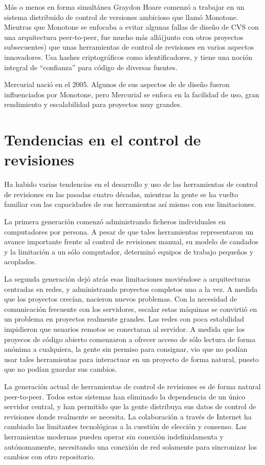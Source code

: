 Más o menos en forma simultánea Graydon Hoare comenzó a trabajar en un
sistema distribuido de control de versiones ambicioso que llamó
Monotone. Mientras que Monotone se enfocaba a evitar algunas fallas de
diseño de CVS con una arquitectura peer-to-peer, fue mucho más
allá(junto con otros proyectos subsecuentes) que unas herramientas de
control de revisiones en varios aspectos innovadores. Usa hashes
criptográficos como identificadores, y tiene una noción integral de 
``confianza'' para código de diversas fuentes.

Mercurial nació en el 2005.  Algunos de sus aspectos de de diseño
fueron influenciados por Monotone, pero Mercurial se enfoca en la
facilidad de uso, gran rendimiento y escalabilidad para proyectos muy
grandes.

\section{Tendencias en el control de revisiones}

Ha habido varias tendencias en el desarrollo y uso de las herramientas
de control de revisiones en las pasadas cuatro décadas, mientras la
gente se ha vuelto familiar con las capacidades de sus herramientas
así mismo con sus limitaciones.

La primera generación comenzó administrando ficheros individuales en
computadores por persona. A pesar de que tales herramientas
representaron un avance importante frente al control de revisiones
manual, su modelo de candados y la limitación a un sólo computador,
determinó equipos de trabajo pequeños y acoplados.

La segunda generación dejó atrás esas limitaciones moviéndose a
arquitecturas centradas en  redes, y administrando proyectos completos
uno a la vez. A medida que los proyectos crecían, nacieron nuevos
problemas. Con la necesidad de comunicación frecuente con los
servidores, escalar estas máquinas se convirtió en un problema en
proyectos realmente grandes. Las redes con poca estabilidad impidieron
que usuarios remotos se conectaran al servidor. A medida que los
proyecos de código abierto comenzaron a ofrecer acceso de sólo lectura
de forma anónima a cualquiera, la gente sin permiso para consignar,
vio que no podían usar tales herramientas para interactuar en un
proyecto de forma natural, puesto que no podían guardar sus cambios.

La generación actual de herramientas de control de revisiones es de
forma natural peer-to-peer.  Todos estos sistemas han eliminado la
dependencia de un único servidor central, y han permitido que la
gente distribuya sus datos de control de revisiones donde realmente se
necesita. La colaboración a través de Internet ha cambiado las
limitantes tecnológicas a la cuestión de elección y consenso. Las
herramientas modernas pueden operar sin conexión indefinidamenta y
autónomamente, necesitando una conexión de red solamente para
sincronizar los cambios con otro repositorio.

